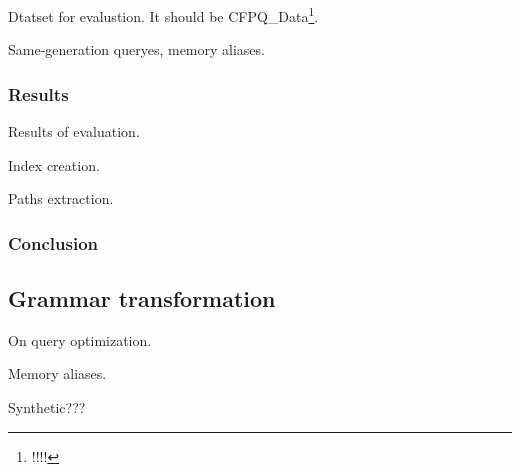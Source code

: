 Dtatset for evalustion. 
It should be CFPQ\_Data\footnote{!!!!}.

Same-generation queryes, memory aliases.

\subsubsection{Results}

Results of evaluation.

Index creation.

Paths extraction.

\subsubsection{Conclusion}

\subsection{Grammar transformation}

On query optimization.

Memory aliases.

Synthetic???